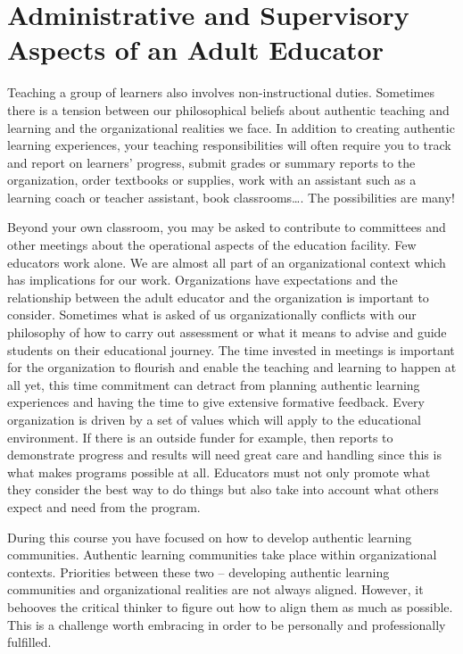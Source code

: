 \documentclass[
]{book}
\begin{document}
\hypertarget{administrative-and-supervisory-aspects-of-an-adult-educator}{%
\section{Administrative and Supervisory Aspects of an Adult Educator}\label{administrative-and-supervisory-aspects-of-an-adult-educator}}

Teaching a group of learners also involves non-instructional duties. Sometimes there is a tension between our philosophical beliefs about authentic teaching and learning and the organizational realities we face. In addition to creating authentic learning experiences, your teaching responsibilities will often require you to track and report on learners' progress, submit grades or summary reports to the organization, order textbooks or supplies, work with an assistant such as a learning coach or teacher assistant, book classrooms\ldots. The possibilities are many!

Beyond your own classroom, you may be asked to contribute to committees and other meetings about the operational aspects of the education facility. Few educators work alone. We are almost all part of an organizational context which has implications for our work. Organizations have expectations and the relationship between the adult educator and the organization is important to consider. Sometimes what is asked of us organizationally conflicts with our philosophy of how to carry out assessment or what it means to advise and guide students on their educational journey. The time invested in meetings is important for the organization to flourish and enable the teaching and learning to happen at all yet, this time commitment can detract from planning authentic learning experiences and having the time to give extensive formative feedback. Every organization is driven by a set of values which will apply to the educational environment. If there is an outside funder for example, then reports to demonstrate progress and results will need great care and handling since this is what makes programs possible at all. Educators must not only promote what they consider the best way to do things but also take into account what others expect and need from the program.

During this course you have focused on how to develop authentic learning communities. Authentic learning communities take place within organizational contexts. Priorities between these two -- developing authentic learning communities and organizational realities are not always aligned. However, it behooves the critical thinker to figure out how to align them as much as possible. This is a challenge worth embracing in order to be personally and professionally fulfilled.
\end{document}
